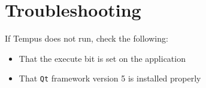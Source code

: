 \section{Troubleshooting}

If Tempus does not run, check the following:
\begin{itemize}
    \item That the execute bit is set on the application
    \item That \texttt{Qt} framework version 5 is installed properly
\end{itemize}

